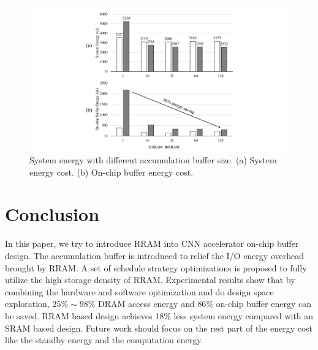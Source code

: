 \documentclass[10pt, conference]{IEEEtran}
\begin{document}
    \begin{figure}[t]
      \centering
      \includegraphics[width=1\columnwidth]{fig/buf_size.pdf}
      \caption{System energy with different accumulation buffer size. (a) System energy cost. (b) On-chip buffer energy cost.}
      \label{fig:exp_buf_depth}
    \end{figure}
    
    \section{Conclusion}
    In this paper, we try to introduce RRAM into CNN accelerator on-chip buffer design. The accumulation buffer is introduced to relief the I/O energy overhead brought by RRAM. A set of schedule strategy optimizations is proposed to fully utilize the high storage density of RRAM. Experimental results show that by combining the hardware and software optimization and do design space exploration, $25\%\sim 98\%$ DRAM access energy and $86\%$ on-chip buffer energy can be saved. RRAM based design achieves 18$\%$ less system energy compared with an SRAM based design. Future work should focus on the rest part of the energy cost like the standby energy and the computation energy.
    
    \small
    
    
    
    
    
\end{document}
